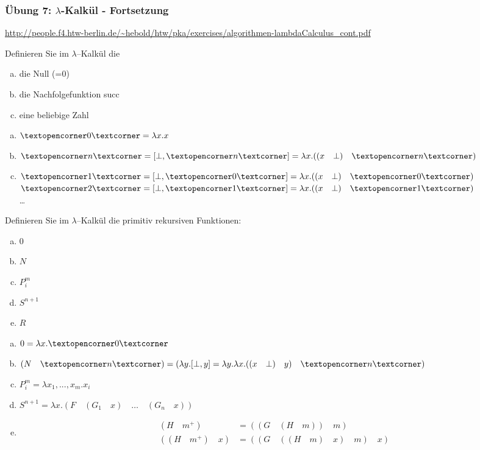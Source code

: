 \begin{card}
	\frametitle{Übung 7: $\lambda$-Kalkül - Fortsetzung}
	\url{http://people.f4.htw-berlin.de/~hebold/htw/pka/exercises/algorithmen-lambdaCalculus_cont.pdf}
\end{card}

\begin{card}
	Definieren Sie im $\lambda$–Kalkül die
	\begin{enumerate}[a)]
    \item die Null (=0)
    \item die Nachfolgefunktion succ
    \item eine beliebige Zahl
	\end{enumerate}
	\hr
	\begin{enumerate}[a)]
    \item $\lambdanumber{0} = \lambda x.x$
    \item $\lambdanumber{n} = [\bot, \lambdanumber{n}] = \lambda x.((x \quad \bot) \quad \lambdanumber{n})$
    \item $\lambdanumber{1} = [\bot, \lambdanumber{0}] = \lambda x.((x \quad \bot) \quad \lambdanumber{0})$\\
          $\lambdanumber{2} = [\bot, \lambdanumber{1}] = \lambda x.((x \quad \bot) \quad \lambdanumber{1})$\\
        \dots
	\end{enumerate}
\end{card}

\begin{card}
	Definieren Sie im $\lambda$–Kalkül die primitiv rekursiven Funktionen:
	\begin{enumerate}[a)]
    \item $0$
    \item $N$
    \item $P^m_i$
    \item $S^{n+1}$
    \item $R$
	\end{enumerate}
	\hr
	\begin{enumerate}[a)]
    \item $0 = \lambda x.\lambdanumber{0}$
    \item $(N \quad \lambdanumber{n}) = (\lambda y.[\bot, y] = \lambda y.\lambda x.((x \quad \bot) \quad y) \quad \lambdanumber{n})$\\
    \item $P^m_i = \lambda x_1,...,x_m.x_i$
    \item $S^{n+1} = \lambda x.(F \quad (G_1 \quad x) \quad \ldots \quad (G_n \quad x))$
    \item
      \begin{align*}
        (H \quad m^+) &= ((G \quad (H \quad m)) \quad m) \\
        ((H \quad m^+) \quad x) &= ((G \quad ((H \quad m) \quad x) \quad m) \quad x)
      \end{align*}
	\end{enumerate}
\end{card}

